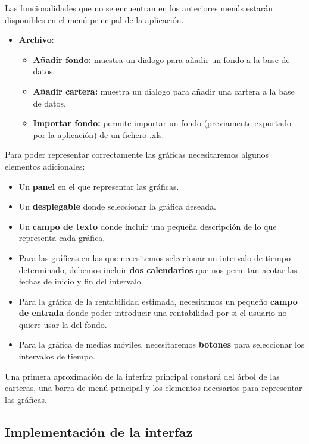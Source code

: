 \documentclass[12pt, a4paper]{article}
\begin{document}
Las funcionalidades que no se encuentran en los anteriores menús estarán disponibles en el menú principal de la aplicación.

\begin{itemize}
	\item \textbf{Archivo}:
	\begin{itemize}
		\item\textbf{Añadir fondo:} muestra un dialogo para añadir un fondo a la base de datos.
		\item \textbf{Añadir cartera:} muestra un dialogo para añadir una cartera a la base de datos.
		\item \textbf{Importar fondo:} permite importar un fondo (previamente exportado por la aplicación) de un fichero .xls.\\
	\end{itemize}
\end{itemize}

Para poder representar correctamente las gráficas necesitaremos algunos elementos adicionales: 
\begin{itemize}
	\item Un \textbf{panel} en el que representar las gráficas.
	\item Un \textbf{desplegable} donde seleccionar la gráfica deseada.
	\item Un \textbf{campo de texto} donde incluir una pequeña descripción de lo que representa cada gráfica.
	\item Para las gráficas en las que necesitemos seleccionar un intervalo de tiempo determinado, debemos incluir \textbf{dos calendarios} que nos permitan acotar las fechas de inicio y fin del intervalo.
	\item Para la gráfica de la rentabilidad estimada, necesitamos un pequeño \textbf{campo de entrada} donde poder introducir una rentabilidad por si el usuario no quiere usar la del fondo.
	\item Para la gráfica de medias móviles, necesitaremos \textbf{botones} para seleccionar los intervalos de tiempo.
\end{itemize}


Una primera aproximación de la interfaz principal constará del árbol de las carteras, una barra de menú principal y los elementos necesarios para representar las gráficas.

\newpage

\subsection{Implementación de la interfaz}
\end{document}
